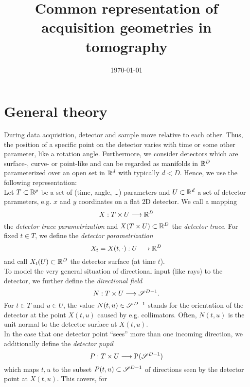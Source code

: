 \documentclass{amsart}
\title{Common representation of acquisition geometries in tomography}
\author{}
\date{\today}
\begin{document}
\maketitle




\section{General theory}
%
%
%
During data acquisition, detector and sample move relative to each other. Thus, the position of a specific point on the detector varies 
with time or some other parameter, like a rotation angle. Furthermore, we consider detectors which are surface-, curve- or point-like and 
can be regarded as manifolds in ${\mathbb{R}}^D$ parameterized over an open set in ${\mathbb{R}}^d$ with typically $d < D$. Hence, we use the following 
representation:\\
Let $T \subset {\ensuremath{\mathbb{R}}}^p$ be a set of (time, angle, \ldots) parameters and $U \subset {\ensuremath{\mathbb{R}}}^d$ a set of detector parameters, e.g. $x$ and $y$ 
coordinates on a flat 2D detector. We call a mapping
%
\begin{equation}
 X: T \times U \longrightarrow {\ensuremath{\mathbb{R}}}^D
\end{equation}
%
the \emph{detector trace parametrization} and $X(T \times U) \subset {\ensuremath{\mathbb{R}}}^D$ the \emph{detector trace}. For fixed $t \in T$, we define the 
\emph{detector parametrization}
%
\begin{equation}
 X_t = X(t, \cdot) : U \longrightarrow {\ensuremath{\mathbb{R}}}^D
\end{equation} 
%
and call $X_t(U) \subset {\ensuremath{\mathbb{R}}}^D$ the detector surface (at time $t$).\\[1ex]
%
%
To model the very general situation of directional input (like rays) to the detector, we further define the \emph{directional field}
%
\begin{equation}
 N: T \times U \longrightarrow \mathscr{S}^{D-1}.
\end{equation}
%
For $t \in T$ and $u \in U$, the value $N(t, u) \in \mathscr{S}^{D-1}$ stands for the orientation of the detector at the point $X(t,u)$ caused 
by e.g. collimators. Often, $N(t, u)$ is the unit normal to the detector surface at $X(t, u)$. \\[1ex]
%
%
In the case that one detector point ``sees'' more than one incoming direction, we additionally define the 
\emph{detector pupil}
%
\begin{equation}
 P: T \times U \longrightarrow \mathrm{P}(\mathscr{S}^{D-1})
\end{equation} 
%
which maps $t, u$ to the subset $P(t, u) \subset \mathscr{S}^{D-1}$ of directions seen by the detector point at $X(t, u)$. This covers, for 
\end{document}
